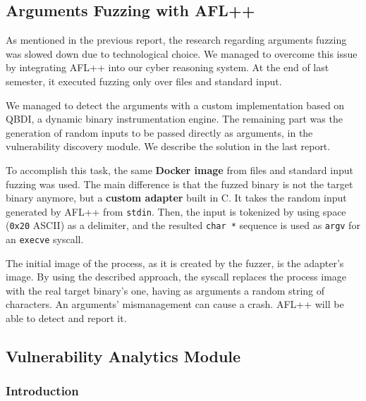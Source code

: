 \documentclass[12pt,a4paper,english,onecolumn]{IEEEtran}
\begin{document}
\subsection{Arguments Fuzzing with AFL++}

As mentioned in the previous report, the research regarding arguments fuzzing was slowed down due to technological choice. We managed to overcome this issue by integrating AFL++ into our cyber reasoning system. At the end of last semester, it executed fuzzing only over files and standard input.

We managed to detect the arguments with a custom implementation based on QBDI, a dynamic binary instrumentation engine. The remaining part was the generation of random inputs to be passed directly as arguments, in the vulnerability discovery module. We describe the solution in the last report.

To accomplish this task, the same \textbf{Docker image} from files and standard input fuzzing was used. The main difference is that the fuzzed binary is not the target binary anymore, but a \textbf{custom adapter} built in C. It takes the random input generated by AFL++ from \texttt{stdin}. Then, the input is tokenized by using space (\texttt{0x20} ASCII) as a delimiter, and the resulted \texttt{char *} sequence is used as \texttt{argv} for an \texttt{execve} syscall.

The initial image of the process, as it is created by the fuzzer, is the adapter's image. By using the described approach, the syscall replaces the process image with the real target binary's one, having as arguments a random string of characters. An arguments' mismanagement can cause a crash. AFL++ will be able to detect and report it.

\subsection{Vulnerability Analytics Module}

\subsubsection{Introduction}
\end{document}
